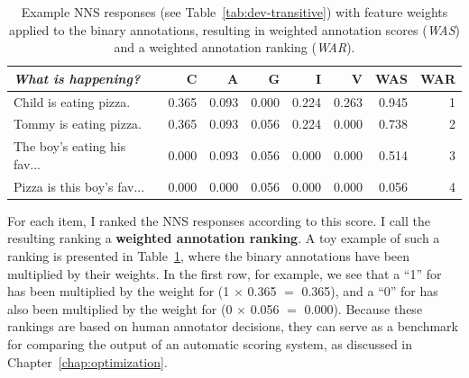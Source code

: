 \begin{table}[htb!]
\begin{center}
\begin{tabular}{|l||r|r|r|r|r||r|r|}
\hline
\textit{What is happening?} & C & A & G & I & V & WAS & WAR \\
\hline
\hline
Child is eating pizza. & 0.365 & 0.093 & 0.000 & 0.224 & 0.263 & 0.945 & 1 \\
\hline
Tommy is eating pizza. & 0.365 & 0.093 & 0.056 & 0.224 & 0.000 & 0.738 & 2 \\
\hline
The boy's eating his fav... & 0.000 & 0.093 & 0.056 & 0.000 & 0.000 & 0.514 & 3 \\
\hline
Pizza is this boy's fav... & 0.000 & 0.000 & 0.056 & 0.000 & 0.000 & 0.056 & 4 \\
\hline
\end{tabular}
\caption{\label{tab:applied-weights} Example NNS responses (see Table~\ref{tab:dev-transitive}) with feature weights applied to the binary annotations, resulting in weighted annotation scores (\textit{WAS}) and a weighted annotation ranking (\textit{WAR}).}
\end{center}
\end{table}

For each item, I ranked the NNS responses according to this score. I call the resulting ranking a \textbf{weighted annotation ranking}. A toy example of such a ranking is presented in Table~\ref{tab:applied-weights}, where the binary annotations have been multiplied by their weights. In the first row, for example, we see that a ``1'' for  has been multiplied by the weight for  (1 $\times$ 0.365 $=$ 0.365), and a ``0'' for  has also been multiplied by the weight for  (0 $\times$ 0.056 $=$ 0.000). Because these rankings are based on human annotator decisions, they can serve as a benchmark for comparing the output of an automatic scoring system, as discussed in Chapter~\ref{chap:optimization}.

